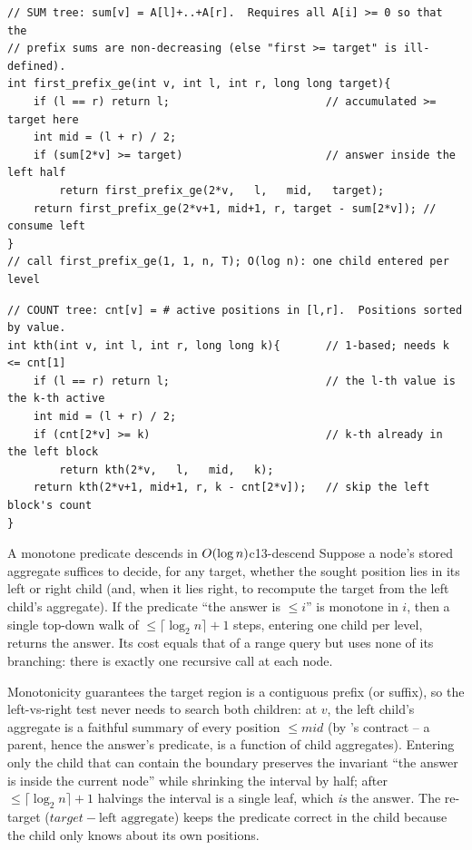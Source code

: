 \begin{lstlisting}[caption={first position whose running prefix sum reaches target: a left-vs-right commit}, label={lst:c13-descend}]
// SUM tree: sum[v] = A[l]+..+A[r].  Requires all A[i] >= 0 so that the
// prefix sums are non-decreasing (else "first >= target" is ill-defined).
int first_prefix_ge(int v, int l, int r, long long target){
    if (l == r) return l;                        // accumulated >= target here
    int mid = (l + r) / 2;
    if (sum[2*v] >= target)                      // answer inside the left half
        return first_prefix_ge(2*v,   l,   mid,   target);
    return first_prefix_ge(2*v+1, mid+1, r, target - sum[2*v]); // consume left
}
// call first_prefix_ge(1, 1, n, T); O(log n): one child entered per level
\end{lstlisting}

\begin{lstlisting}[caption={k-th active element by counts -- Ch.18 lifting, re-done as a descend}, label={lst:c13-kthseg}]
// COUNT tree: cnt[v] = # active positions in [l,r].  Positions sorted by value.
int kth(int v, int l, int r, long long k){       // 1-based; needs k <= cnt[1]
    if (l == r) return l;                        // the l-th value is the k-th active
    int mid = (l + r) / 2;
    if (cnt[2*v] >= k)                           // k-th already in the left block
        return kth(2*v,   l,   mid,   k);
    return kth(2*v+1, mid+1, r, k - cnt[2*v]);   // skip the left block's count
}
\end{lstlisting}

\begin{theorem}{A monotone predicate descends in \(O(\log n)\)}{c13-descend}
Suppose a node's stored aggregate suffices to decide, for any target, whether
the sought position lies in its left or right child (and, when it lies right, to
recompute the target from the left child's aggregate).  If the predicate
``the answer is \(\le i\)'' is monotone in \(i\), then a single top-down walk of
\(\le\lceil\log_2 n\rceil{+}1\) steps, entering one child per level, returns the
answer.  Its cost equals that of a range query but uses none of its branching:
there is exactly one recursive call at each node.
\end{theorem}
\begin{proofbox}
Monotonicity guarantees the target region is a contiguous prefix (or suffix), so
the left-vs-right test never needs to search both children: at \(v\), the left
child's aggregate is a faithful summary of every position \(\le mid\) (by
's contract -- a parent, hence the answer's predicate, is a
function of child aggregates).  Entering only the child that can contain the
boundary preserves the invariant ``the answer is inside the current node'' while
shrinking the interval by half; after \(\le\lceil\log_2 n\rceil{+}1\) halvings the
interval is a single leaf, which \emph{is} the answer.  The re-target
(\(\mathit{target}-\text{left aggregate}\)) keeps the predicate correct in the
child because the child only knows about its own positions.
\end{proofbox}

